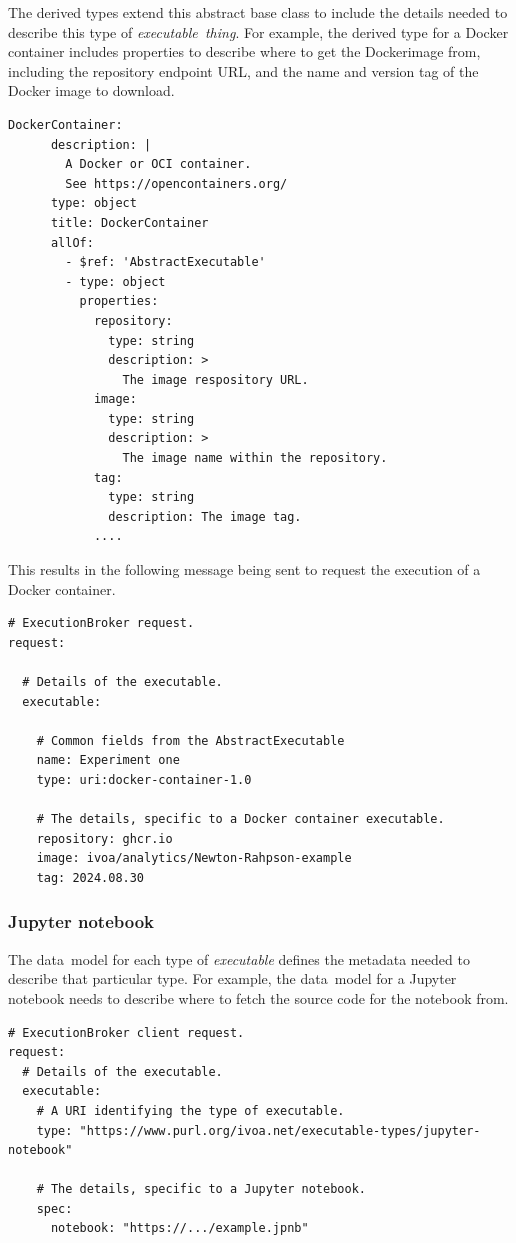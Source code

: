 \documentclass[11pt,a4paper]{ivoa}
\newcommand{\datamodel} {data~model}
\newcommand{\executable} {\textit{executable}}
\newcommand{\executablething}[1] {\textit{executable~thing#1}}
\newcommand{\jupyternotebook} {Jupyter notebook}
\newcommand{\docker} {Docker}
\newcommand{\dockercontainer} {Docker container}
\begin{document}
The derived types extend this abstract base class to include the details needed to
describe this type of \executablething{}.
For example, the derived type for a \dockercontainer{} includes properties
to describe where to get the \docker image from, including the repository endpoint URL,
and the name and version tag of the \docker{} image to download.

\begin{lstlisting}[]
    DockerContainer:
      description: |
        A Docker or OCI container.
        See https://opencontainers.org/
      type: object
      title: DockerContainer
      allOf:
        - $ref: 'AbstractExecutable'
        - type: object
          properties:
            repository:
              type: string
              description: >
                The image respository URL.
            image:
              type: string
              description: >
                The image name within the repository.
            tag:
              type: string
              description: The image tag.
            ....
\end{lstlisting}

This results in the following message being sent to request the execution
of a \dockercontainer{}.

\begin{lstlisting}[]
# ExecutionBroker request.
request:

  # Details of the executable.
  executable:

    # Common fields from the AbstractExecutable
    name: Experiment one
    type: uri:docker-container-1.0

    # The details, specific to a Docker container executable.
    repository: ghcr.io
    image: ivoa/analytics/Newton-Rahpson-example
    tag: 2024.08.30

\end{lstlisting}

\subsubsection{\jupyternotebook{}}
\label{jupyternotebook}
The \datamodel{} for each type of \executable{} defines the metadata needed to
describe that particular type.
For example, the \datamodel{} for a \jupyternotebook{} needs to describe where
to fetch the source code for the notebook from.

\begin{lstlisting}[]
# ExecutionBroker client request.
request:
  # Details of the executable.
  executable:
    # A URI identifying the type of executable.
    type: "https://www.purl.org/ivoa.net/executable-types/jupyter-notebook"

    # The details, specific to a Jupyter notebook.
    spec:
      notebook: "https://.../example.jpnb"
\end{lstlisting}
\end{document}
